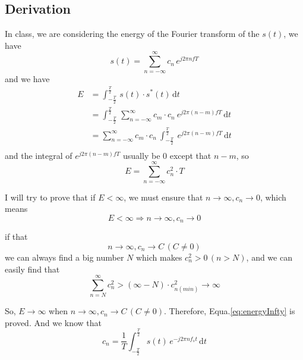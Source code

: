 \documentclass{article}
\begin{document}
\subsection{Derivation}
In class, we are considering the energy of the Fourier transform of the $s(t)$, we have
\begin{equation}
s(t) = \sum_{n = -\infty}^{\infty} c_n \, e^{j2 \pi n fT}
\end{equation}
and we have
\begin{equation*}
\begin{aligned}
E &= \int_{-\frac{T}{2}}^{\frac{T}{2}} \, s(t) \cdot s^*(t) \, \mathrm{d}t \\ 
&= \int_{-\frac{T}{2}}^{\frac{T}{2}} \, \sum_{n = -\infty}^{\infty} c_m \cdot c_n ~ e^{j2 \pi (n - m) fT}  \, \mathrm{d}t \\ 
&= \sum_{n = -\infty}^{\infty} c_m \cdot c_n ~ \int_{-\frac{T}{2}}^{\frac{T}{2}} ~ e^{j2 \pi (n - m) fT}  \, \mathrm{d}t \\ 
\end{aligned}
\end{equation*}
and the integral of $e^{j2 \pi (n - m) fT}$ usually be $0$ except that $n - m$, so
$$
E =\sum_{n = -\infty}^{\infty} c_n^2 \cdot T
$$

I will try to prove that if $E < \infty$, we must ensure that $n \to \infty, c_n \to 0$, which means 
\begin{equation}
E < \infty \Rightarrow  n \to \infty, c_n \to 0
\label{eq:energyInfty}
\end{equation}

if that
$$
n  \to \infty, c_n \to C \, (C \neq 0)
$$
we can always find a big number $N$ which makes $c_n^2 > 0 \, (n > N) $, and we can easily find that
$$
\sum_{n = N}^{\infty} c_n^2 > (\infty - N) \cdot c^2_{n(min)} \to \infty
$$

So, $E\to \infty$ when $n  \to \infty, c_n \to C \, (C \neq 0)$.
Therefore, Equa.\ref{eq:energyInfty} is proved.
And we know that
\begin{equation*}
    c_n = \frac{1}{T} \int_{-\frac{T}{2}}^{\frac{T}{2}} s(t) \, e^{-j2\pi n f_s t} \, \mathrm{d}t
\end{equation*}
\end{document}

